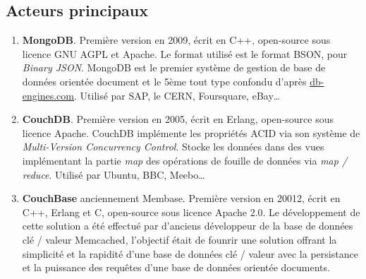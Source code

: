 \subsection{Acteurs principaux}

  \begin{enumerate}
    \item \textbf{MongoDB}. Première version en 2009, écrit en C++, open-source sous licence GNU AGPL et Apache. Le format utilisé est le format BSON, pour \textit{Binary JSON}. MongoDB est le premier système de gestion de base de données orientée document et le 5ème tout type confondu d'après \url{db-engines.com}. Utilisé par SAP, le CERN, Foursquare, eBay\dots\cite{Wikipedia_mongodb}
    \item \textbf{CouchDB}. Première version en 2005, écrit en Erlang, open-source sous licence Apache. CouchDB implémente les propriétés ACID via son système de \textit{Multi-Version Concurrency Control}. Stocke les données dans des vues implémentant la partie \textit{map} des opérations de fouille de données via \textit{map / reduce}. Utilisé par Ubuntu, BBC, Meebo\dots\cite{Wikipedia_couchdb}
    \item \textbf{CouchBase} anciennement Membase. Première version en 20012, écrit en C++, Erlang et C, open-source sous licence Apache 2.0. Le développement de cette solution a été effectué par d'anciens développeur de la base de données clé / valeur Memcached, l'objectif était de founrir une solution offrant la simplicité et la rapidité d'une base de données clé / valeur avec la persistance et la puissance des requêtes d'une base de données orientée documents.\cite{Wikipedia_couchbase}
  \end{enumerate}
